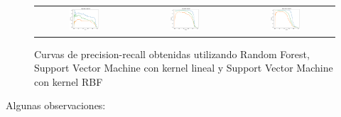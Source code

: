 \begin{figure}[h!]
\begin{center}
\begin{tabular}{ccc}
\includegraphics[width=0.32\textwidth]{Kap3/test_results_train=b360Test=b234.png} &
\includegraphics[width=0.32\textwidth]{Kap3/test_results_train=b360Test=b261.png} &
\includegraphics[width=0.32\textwidth]{Kap3/test_results_train=b360Test=b278.png}

\end{tabular}

\end{center}
\caption[short]{Curvas de precision-recall obtenidas utilizando Random Forest, Support Vector Machine con kernel lineal y Support Vector Machine con kernel RBF}
\label{fig:testresults}

\end{figure}

\newpage
Algunas observaciones:

